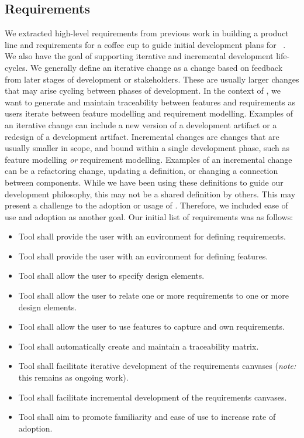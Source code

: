 \subsection{Requirements}
We extracted high-level requirements from previous work in building a product line and requirements for a coffee cup to guide initial development plans for \tool~\cite{chiang2024mapping}. We also have the goal of supporting iterative and incremental development life-cycles. We generally define an iterative change as a change based on feedback from later stages of development or stakeholders. These are usually larger changes that may arise cycling between phases of development. In the context of \tool, we want to generate and maintain traceability between features and requirements as users iterate between feature modelling and requirement modelling. Examples of an iterative change can include a new version of a development artifact or a redesign of a development artifact. Incremental changes are changes that are usually smaller in scope, and bound within a single development phase, such as feature modelling \textit{or} requirement modelling. Examples of an incremental change can be a refactoring change, updating a definition, or changing a connection between components. While we have been using these definitions to guide our development philosophy, this may not be a shared definition by others. This may present a challenge to the adoption or usage of \tool. Therefore, we included ease of use and adoption as another goal. Our initial list of requirements was as follows:


\begin{itemize}
	\item Tool shall provide the user with an environment for defining requirements.
	\item Tool shall provide the user with an environment for defining features.
	\item Tool shall allow the user to specify design elements.
	\item Tool shall allow the user to relate one or more requirements to one or more design elements.
	\item Tool shall allow the user to use features to capture and own requirements.
	\item Tool shall automatically create and maintain a traceability matrix.
	\item Tool shall facilitate iterative development of the requirements canvases (\textit{note:} this remains as ongoing work).
	\item Tool shall facilitate incremental development of the requirements canvases.
	\item Tool shall aim to promote familiarity and ease of use to increase rate of adoption.
\end{itemize}

